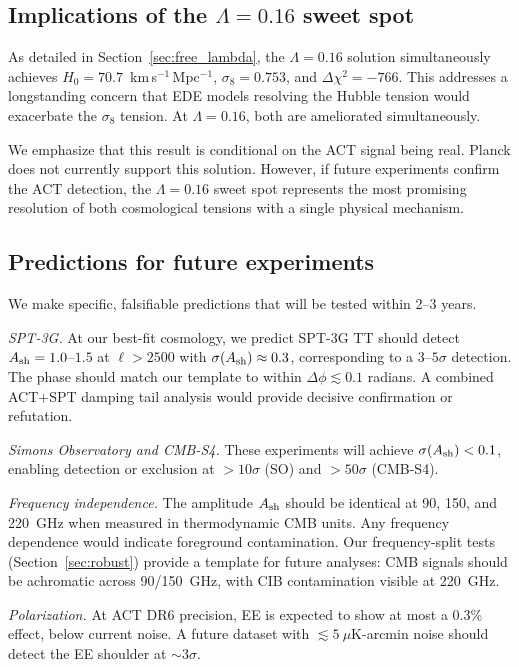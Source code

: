 \documentclass[twocolumn,showpacs,preprintnumbers,amsmath,amssymb,prd]{revtex4-2}
\newcommand{\kms}{km\,s$^{-1}$\,Mpc$^{-1}$}
\begin{document}
\subsection{Implications of the $\Lambda = 0.16$ sweet spot}

As detailed in Section~\ref{sec:free_lambda}, the $\Lambda = 0.16$ solution 
simultaneously achieves $H_0 = 70.7$~\kms, $\sigma_8 = 0.753$, and 
$\Delta\chi^2 = -766$. This addresses a longstanding concern that EDE 
models resolving the Hubble tension would exacerbate the $\sigma_8$ 
tension. At $\Lambda = 0.16$, both are ameliorated simultaneously.

We emphasize that this result is conditional on the ACT signal being 
real. Planck does not currently support this solution. However, if 
future experiments confirm the ACT detection, the $\Lambda = 0.16$ 
sweet spot represents the most promising resolution of both cosmological 
tensions with a single physical mechanism.

\subsection{Predictions for future experiments}
\label{sec:predictions}

We make specific, falsifiable predictions that will be tested within 2--3 years.

\emph{SPT-3G.} At our best-fit cosmology, we predict SPT-3G TT should detect 
$A_{\rm sh} = 1.0$--$1.5$ at $\ell > 2500$ with $\sigma(A_{\rm sh}) \approx 0.3$, 
corresponding to a $3$--$5\sigma$ detection. The phase should match our 
template to within $\Delta\phi \lesssim 0.1$ radians. A combined ACT+SPT 
damping tail analysis would provide decisive confirmation or refutation.

\emph{Simons Observatory and CMB-S4.} These experiments will achieve 
$\sigma(A_{\rm sh}) < 0.1$, enabling detection or exclusion at $>10\sigma$ 
(SO) and $>50\sigma$ (CMB-S4).

\emph{Frequency independence.} The amplitude $A_{\rm sh}$ should be 
identical at 90, 150, and 220~GHz when measured in thermodynamic CMB units. 
Any frequency dependence would indicate foreground contamination. Our 
frequency-split tests (Section~\ref{sec:robust}) provide a template for 
future analyses: CMB signals should be achromatic across 90/150~GHz, 
with CIB contamination visible at 220~GHz.

\emph{Polarization.} At ACT DR6 precision, EE is expected to show at most 
a 0.3\% effect, below current noise. A future dataset with 
$\lesssim 5~\mu$K-arcmin noise should detect the EE shoulder at $\sim 3\sigma$.
\end{document}
